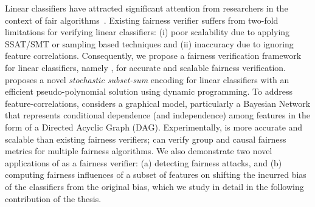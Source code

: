 Linear classifiers have attracted significant attention from researchers in the context of fair algorithms~\cite{pleiss2017fairness,zafar2017fairness,dressel2018accuracy, john2020verifying}. Existing fairness verifier suffers from two-fold limitations for verifying linear classifiers: (i) poor scalability due to applying SSAT/SMT or sampling based techniques and (ii) inaccuracy due to ignoring feature correlations. Consequently, we propose a fairness verification framework for linear classifiers, namely {\fvgm}, for accurate and scalable fairness verification. {\fvgm} proposes a novel \textit{stochastic subset-sum} encoding for linear classifiers with an efficient pseudo-polynomial solution using dynamic programming. To address feature-correlations, {\fvgm} considers a graphical model, particularly a Bayesian Network that represents conditional dependence (and independence) among features in the form of a Directed Acyclic Graph (DAG). Experimentally,  {\fvgm} is more accurate and scalable than existing fairness verifiers; {\fvgm} can verify group and causal fairness metrics for multiple fairness algorithms. We also demonstrate two novel applications of {\fvgm} as a fairness verifier: (a) detecting fairness attacks, and (b) computing fairness influences of a subset of features on shifting the incurred bias of the classifiers from the original bias, which we study in detail in the following contribution of the thesis.






